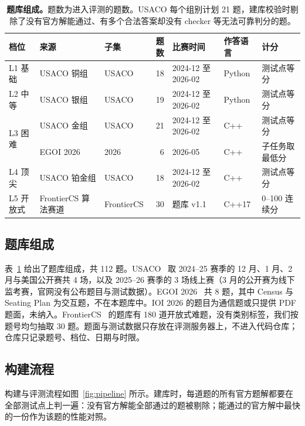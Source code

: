 \documentclass[11pt,a4paper,fontset=none]{ctexart}
\begin{document}
\begin{table}[t]
  \centering
  \caption{\textbf{题库组成。}题数为进入评测的题数。USACO 每个组别计划 21 题，建库校验时剔除了没有官方解能通过、有多个合法答案却没有 checker 等无法可靠判分的题。}
  \label{tab:composition}
  \small
  \begin{tabular}{@{}lllrlll@{}}
    \toprule
    档位 & 来源 & 子集 & 题数 & 比赛时间 & 作答语言 & 计分 \\
    \midrule
    L1 基础 & USACO 铜组 & USACO & 18 & 2024-12 至 2026-02 & Python & 测试点等分 \\
    L2 中等 & USACO 银组 & USACO & 19 & 2024-12 至 2026-02 & Python & 测试点等分 \\
    \multirow{2}{*}{L3 困难} & USACO 金组 & USACO & 21 & 2024-12 至 2026-02 & C++ & 测试点等分 \\
     & EGOI 2026 & 2026 & 6 & 2026-05 & C++ & 子任务取最低分 \\
    L4 顶尖 & USACO 铂金组 & USACO & 18 & 2024-12 至 2026-02 & C++ & 测试点等分 \\
    L5 开放式 & FrontierCS 算法赛道 & FrontierCS & 30 & 题库 v1.1 & C++17 & 0--100 连续分 \\
    \bottomrule
  \end{tabular}
\end{table}

\subsection{题库组成}

表~\ref{tab:composition} 给出了题库组成，共 112 题。USACO~\cite{usaco} 取 2024--25 赛季的 12 月、1 月、2 月与美国公开赛共 4 场，以及 2025--26 赛季的 3 场线上赛（3 月的公开赛为线下监考赛，官网没有公布题目与测试数据）。EGOI 2026~\cite{egoi} 共 8 题，其中 Census 与 Seating Plan 为交互题，不在本题库中。IOI 2026 的题目为通信题或只提供 PDF 题面，未纳入。FrontierCS~\cite{frontiercs,frontiercsrepo} 的题库有 180 道开放式难题，没有类别标签，我们按题号均匀抽取 30 题。题面与测试数据只存放在评测服务器上，不进入代码仓库；仓库只记录题号、档位、日期与时限。

\subsection{构建流程}

构建与评测流程如图~\ref{fig:pipeline} 所示。建库时，每道题的所有官方题解都要在全部测试点上判一遍：没有官方解能全部通过的题被剔除；能通过的官方解中最快的一份作为该题的性能对照。
\end{document}

